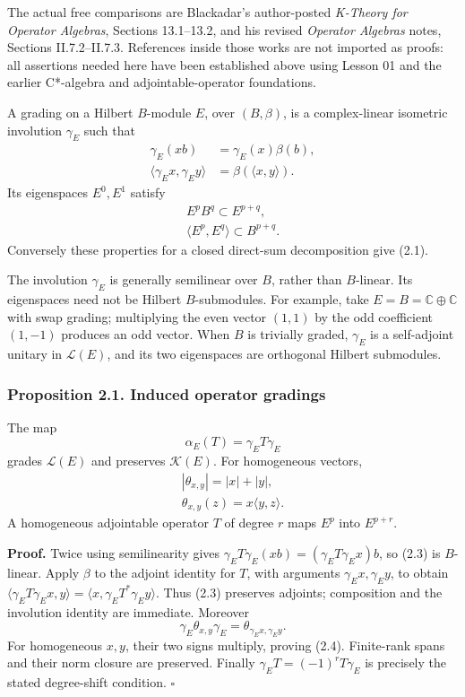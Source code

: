 \documentclass[
  11pt,
]{article}
\begin{document}
The actual free comparisons are Blackadar's author-posted \emph{K-Theory
for Operator Algebras}, Sections 13.1--13.2, and his revised
\emph{Operator Algebras} notes, Sections II.7.2--II.7.3. References
inside those works are not imported as proofs: all assertions needed
here have been established above using Lesson 01 and the earlier
C*-algebra and adjointable-operator foundations.

A grading on a Hilbert \(B\)-module \(E\), over \((B,\beta)\), is a
complex-linear isometric involution \(\gamma_E\) such that \[
\begin{aligned}
\gamma_E(xb)&=\gamma_E(x)\beta(b),\\
\langle\gamma_E x,\gamma_E y\rangle
 &=\beta(\langle x,y\rangle).
\end{aligned}
\tag{2.1}
\] Its eigenspaces \(E^0,E^1\) satisfy \[
\begin{gathered}
E^pB^q\subset E^{p+q},\\
\langle E^p,E^q\rangle\subset B^{p+q}.
\end{gathered}
\tag{2.2}
\] Conversely these properties for a closed direct-sum decomposition
give (2.1).

The involution \(\gamma_E\) is generally semilinear over \(B\), rather
than \(B\)-linear. Its eigenspaces need not be Hilbert \(B\)-submodules.
For example, take \(E=B=\mathbb C\oplus\mathbb C\) with swap grading;
multiplying the even vector \((1,1)\) by the odd coefficient \((1,-1)\)
produces an odd vector. When \(B\) is trivially graded, \(\gamma_E\) is
a self-adjoint unitary in \(\mathcal L(E)\), and its two eigenspaces are
orthogonal Hilbert submodules.

\subsubsection{Proposition 2.1. Induced operator
gradings}\label{proposition-2.1.-induced-operator-gradings}

The map \[
\alpha_E(T)=\gamma_E T\gamma_E
\tag{2.3}
\] grades \(\mathcal L(E)\) and preserves \(\mathcal K(E)\). For
homogeneous vectors, \[
\begin{gathered}
|\theta_{x,y}|=|x|+|y|,\\
\theta_{x,y}(z)=x\langle y,z\rangle.
\end{gathered}
\tag{2.4}
\] A homogeneous adjointable operator \(T\) of degree \(r\) maps \(E^p\)
into \(E^{p+r}\).

\textbf{Proof.} Twice using semilinearity gives
\(\gamma_E T\gamma_E(xb)=(\gamma_E T\gamma_E x)b\), so (2.3) is
\(B\)-linear. Apply \(\beta\) to the adjoint identity for \(T\), with
arguments \(\gamma_E x,\gamma_E y\), to obtain
\(\langle\gamma_E T\gamma_E x,y\rangle
=\langle x,\gamma_E T^*\gamma_E y\rangle\). Thus (2.3) preserves
adjoints; composition and the involution identity are immediate.
Moreover \[
\gamma_E\theta_{x,y}\gamma_E
=\theta_{\gamma_E x,\gamma_E y}.
\] For homogeneous \(x,y\), their two signs multiply, proving (2.4).
Finite-rank spans and their norm closure are preserved. Finally
\(\gamma_ET=(-1)^rT\gamma_E\) is precisely the stated degree-shift
condition. \(\square\)
\end{document}
